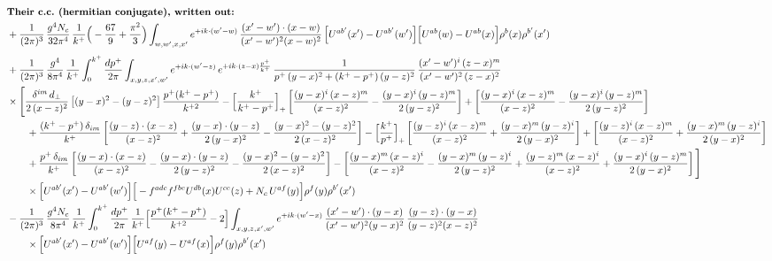 \documentclass[10pt]{article}
\numberwithin{equation}{section}
\begin{document}
\begin{align}
&\textbf{Their c.c.\ (hermitian conjugate), written out:}\notag\\
&+\frac{1}{(2\pi)^{3}}\,\frac{g^{4}N_{c}}{32\pi^{4}}\,\frac{1}{k^{+}}\Big(-\frac{67}{9}+\frac{\pi^{2}}{3}\Big)\int_{w,w^{\prime},x,x^{\prime}}e^{+ik\cdot (w^{\prime}-w)}\,\frac{(x^{\prime}-w^{\prime})\cdot(x-w)}{(x^{\prime}-w^{\prime})^{2}(x-w)^{2}}\,\Big[U^{ab^{\prime}}(x^{\prime})-U^{ab^{\prime}}(w^{\prime})\Big]\Big[U^{ab}(w)-U^{ab}(x)\Big]\rho^{b}(x)\rho^{b^{\prime}}(x^{\prime})\notag\\[4pt]
&+\frac{1}{(2\pi)^{3}}\,\frac{g^{4}}{8\pi^{4}}\,\frac{1}{k^{+}}\int_{0}^{k^{+}}\frac{dp^{+}}{2\pi}\int_{x,y,z,x^{\prime},w^{\prime}}e^{+ik\cdot (w^{\prime}-z)}\,e^{+ik\cdot (z-x)\frac{p^{+}}{k^{+}}}\,\frac{1}{p^{+}\,(y-x)^{2}+(k^{+}-p^{+})\,(y-z)^{2}}\,\frac{(x^{\prime}-w^{\prime})^{i}\,(z-x)^{m}}{(x^{\prime}-w^{\prime})^{2}\,(z-x)^{2}}\notag\\
&\times\Bigg[\frac{\delta^{im}\,d_{\perp}}{2\,(x-z)^{2}}\left[(y-x)^{2}-(y-z)^{2}\right]\frac{p^{+}(k^{+}-p^{+})}{k^{+2}}
-\Big[\frac{k^{+}}{k^{+}-p^{+}}\Big]_{+}\left[\frac{(y-x)^{i}\,(x-z)^{m}}{(x-z)^{2}}-\frac{(y-x)^{i}\,(y-z)^{m}}{2\,(y-z)^{2}}\right]
+\left[\frac{(y-x)^{i}\,(x-z)^{m}}{(x-z)^{2}}-\frac{(y-x)^{i}\,(y-z)^{m}}{2\,(y-z)^{2}}\right]\notag\\
&\qquad+\frac{(k^{+}-p^{+})\,\delta_{im}}{k^{+}}\left[\frac{(y-z)\cdot(x-z)}{(x-z)^{2}}+\frac{(y-x)\cdot(y-z)}{2\,(y-x)^{2}}-\frac{(y-x)^{2}-(y-z)^{2}}{2\,(x-z)^{2}}\right]
-\Big[\frac{k^{+}}{p^{+}}\Big]_{+}\left[\frac{(y-z)^{i}\,(x-z)^{m}}{(x-z)^{2}}+\frac{(y-x)^{m}\,(y-z)^{i}}{2\,(y-x)^{2}}\right]+\left[\frac{(y-z)^{i}\,(x-z)^{m}}{(x-z)^{2}}+\frac{(y-x)^{m}\,(y-z)^{i}}{2\,(y-x)^{2}}\right]\notag\\
&\qquad+\frac{p^{+}\,\delta_{im}}{k^{+}}\left[\frac{(y-x)\cdot(x-z)}{(x-z)^{2}}-\frac{(y-x)\cdot(y-z)}{2\,(y-z)^{2}}-\frac{(y-x)^{2}-(y-z)^{2}}{2\,(x-z)^{2}}\right]
-\left[\frac{(y-x)^{m}\,(x-z)^{i}}{(x-z)^{2}}-\frac{(y-x)^{m}\,(y-z)^{i}}{2\,(y-z)^{2}}+\frac{(y-z)^{m}\,(x-z)^{i}}{(x-z)^{2}}+\frac{(y-x)^{i}\,(y-z)^{m}}{2\,(y-x)^{2}}\right]\Bigg]\notag\\
&\qquad\times\Big[U^{ab^{\prime}}(x^{\prime})-U^{ab^{\prime}}(w^{\prime})\Big]\Big[-f^{adc}f^{fbe}U^{db}(x)U^{ce}(z)+N_{c}\,U^{af}(y)\Big]\rho^{f}(y)\rho^{b^{\prime}}(x^{\prime})\notag\\
&-\frac{1}{(2\pi)^{3}}\,\frac{g^{4}N_{c}}{8\pi^{4}}\,\frac{1}{k^{+}}\int_{0}^{k^{+}}\frac{dp^{+}}{2\pi}\,\frac{1}{k^{+}}\Big[\frac{p^{+}(k^{+}-p^{+})}{k^{+2}}-2\Big]\int_{x,y,z,x^{\prime},w^{\prime}}e^{+ik\cdot (w^{\prime}-x)}\,\frac{(x^{\prime}-w^{\prime})\cdot(y-x)}{(x^{\prime}-w^{\prime})^{2}(y-x)^{2}}\,\frac{(y-z)\cdot(y-x)}{(y-z)^{2}(x-z)^{2}}\notag\\&\qquad\times\Big[U^{ab^{\prime}}(x^{\prime})-U^{ab^{\prime}}(w^{\prime})\Big]\Big[U^{af}(y)-U^{af}(x)\Big]\rho^{f}(y)\rho^{b^{\prime}}(x^{\prime})\notag\\[4pt]

\end{align}
\end{document}
